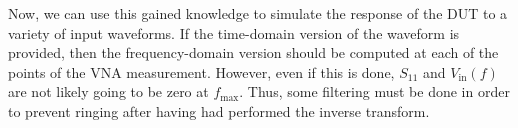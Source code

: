 Now, we can use this gained knowledge to simulate the response of the DUT to a
variety of input waveforms. If the time-domain version of the waveform is
provided, then the frequency-domain version should be computed at each of the
points of the VNA measurement. However, even if this is done, $ S_{11} $ and $
V_{\text{in}}(f) $ are not likely going to be zero at $ f_{\text{max}} $. Thus,
some filtering must be done in order to prevent ringing after having had
performed the inverse transform.
